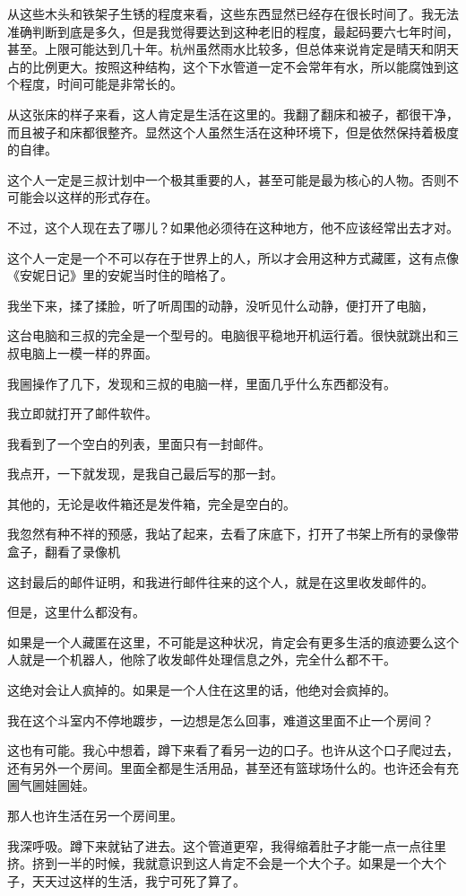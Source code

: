 从这些木头和铁架子生锈的程度来看，这些东西显然已经存在很长时间了。我无法准确判断到底是多久，但是我觉得要达到这种老旧的程度，最起码要六七年时间，甚至。上限可能达到几十年。杭州虽然雨水比较多，但总体来说肯定是晴天和阴天占的比例更大。按照这种结构，这个下水管道一定不会常年有水，所以能腐蚀到这个程度，时间可能是非常长的。

从这张床的样子来看，这人肯定是生活在这里的。我翻了翻床和被子，都很干净，而且被子和床都很整齐。显然这个人虽然生活在这种环境下，但是依然保持着极度的自律。

这个人一定是三叔计划中一个极其重要的人，甚至可能是最为核心的人物。否则不可能会以这样的形式存在。

不过，这个人现在去了哪儿？如果他必须待在这种地方，他不应该经常出去才对。

这个人一定是一个不可以存在于世界上的人，所以才会用这种方式藏匿，这有点像《安妮日记》里的安妮当时住的暗格了。

我坐下来，揉了揉脸，听了听周围的动静，没听见什么动静，便打开了电脑，

这台电脑和三叔的完全是一个型号的。电脑很平稳地开机运行着。很快就跳出和三叔电脑上一模一样的界面。

我圌操作了几下，发现和三叔的电脑一样，里面几乎什么东西都没有。

我立即就打开了邮件软件。

我看到了一个空白的列表，里面只有一封邮件。

我点开，一下就发现，是我自己最后写的那一封。

其他的，无论是收件箱还是发件箱，完全是空白的。

我忽然有种不祥的预感，我站了起来，去看了床底下，打开了书架上所有的录像带盒子，翻看了录像机

这封最后的邮件证明，和我进行邮件往来的这个人，就是在这里收发邮件的。

但是，这里什么都没有。

如果是一个人藏匿在这里，不可能是这种状况，肯定会有更多生活的痕迹要么这个人就是一个机器人，他除了收发邮件处理信息之外，完全什么都不干。

这绝对会让人疯掉的。如果是一个人住在这里的话，他绝对会疯掉的。

我在这个斗室内不停地踱步，一边想是怎么回事，难道这里面不止一个房间？

这也有可能。我心中想着，蹲下来看了看另一边的口子。也许从这个口子爬过去，还有另外一个房间。里面全都是生活用品，甚至还有篮球场什么的。也许还会有充圌气圌娃圌娃。

那人也许生活在另一个房间里。

我深呼吸。蹲下来就钻了进去。这个管道更窄，我得缩着肚子才能一点一点往里挤。挤到一半的时候，我就意识到这人肯定不会是一个大个子。如果是一个大个子，天天过这样的生活，我宁可死了算了。

